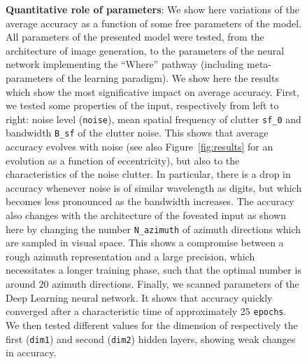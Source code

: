 \begin{figure}[t!]%
\caption{
{\bf Quantitative role of parameters}: We show here variations of the average accuracy as a function of some free parameters of the model. All parameters of the presented model were tested, from the architecture of image generation, to the parameters of the neural network implementing the ``Where'' pathway (including meta-parameters of the learning paradigm). We show here the results which show the most significative impact on average accuracy. %
\A First, we tested some properties of the input, respectively from left to right: noise level (\texttt{noise}), mean spatial frequency of clutter \texttt{sf\_0} and bandwidth \texttt{B\_sf} of the clutter noise. This shows that average accuracy evolves with noise (see also Figure~\ref{fig:results} for an evolution as a function of eccentricity), but also to the characteristics of the noise clutter. In particular, there is a drop in accuracy whenever noise is of similar wavelength as digits, but which becomes less pronounced as the bandwidth increases. %
\B The accuracy also changes with the architecture of the foveated input as shown here by changing the number \texttt{N\_azimuth} of azimuth directions which are sampled in visual space. This shows a compromise between a rough azimuth representation and a large precision, which necessitates a longer training phase, such that the optimal number is around $20$ azimuth directions. %
\C Finally, we scanned parameters of the Deep Learning neural network. It shows that accuracy quickly converged after a characteristic time of approximately $25$ \texttt{epochs}. We then tested different values for the dimension of respectively the first (\texttt{dim1}) and second (\texttt{dim2}) hidden layers, showing weak changes in accuracy. %
\label{fig:params}}%
\end{figure}%


